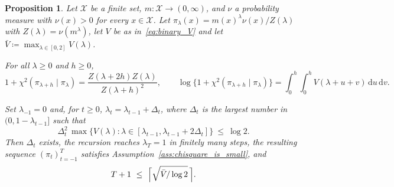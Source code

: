 \documentclass[aos]{imsart}%
\newcommand{\ambientspace}[0]{\mathcal{X}}
\newcommand{\dd}[0]{\mathrm{d}}
\theoremstyle{plain}
\newtheorem{proposition}{Proposition}[section]
\theoremstyle{definition}
\begin{document}
    \begin{proposition}
        \label{prop:binary_horizon}
        Let $\ambientspace$ be a finite set, $m:\ambientspace\to(0,\infty)$,
        and $\nu$ a probability measure with $\nu(x)>0$ for every
        $x\in\ambientspace$. Let
        $\pi_\lambda(x)=m(x)^{\lambda}\nu(x)/Z(\lambda)$ with
        $Z(\lambda)=\nu(m^{\lambda})$, let $V$ be as in~\eqref{eq:binary_V} and
        let $\bar V\coloneq\max_{\lambda\in[0,2]}V(\lambda)$.
        \begin{equivcond}
            \item\label{it:binary_chi_identity}
            For all $\lambda\geq0$ and $h\geq0$,
            \begin{equation}
                \label{eq:binary_chi_identity}
                1+\chi^{2}(\pi_{\lambda+h}\mid\pi_{\lambda})
                =\frac{Z(\lambda+2h)Z(\lambda)}{Z(\lambda+h)^{2}},
                \qquad
                \log\bigl\{1+\chi^{2}(\pi_{\lambda+h}\mid\pi_{\lambda})\bigr\}
                =\int_0^{h}\!\!\int_0^{h}\!V(\lambda+u+v)\,\dd u\,\dd v .
            \end{equation}

            \item\label{it:binary_schedule}
            Set $\lambda_{-1}=0$ and, for $t\geq0$,
            $\lambda_t=\lambda_{t-1}+\Delta_t$, where $\Delta_t$ is the largest
            number in $(0,1-\lambda_{t-1}]$ such that
            \begin{equation}
                \label{eq:binary_schedule}
                \Delta_t^{2}\,\max\bigl\{V(\lambda):
                \lambda\in[\lambda_{t-1},\lambda_{t-1}+2\Delta_t]\bigr\}
                \ \leq\ \log2 .
            \end{equation}
            Then $\Delta_t$ exists, the recursion reaches $\lambda_T=1$ in
            finitely many steps, the resulting sequence
            $(\pi_t)_{t=-1}^{T}$ satisfies
            Assumption~\ref{ass:chisquare_is_small}, and
            \begin{equation}
                \label{eq:binary_T_crude}
                T+1\ \leq\ \Bigl\lceil\sqrt{\bar V/\log2}\,\Bigr\rceil .
            \end{equation}


\end{equivcond}
\end{proposition}
\end{document}
